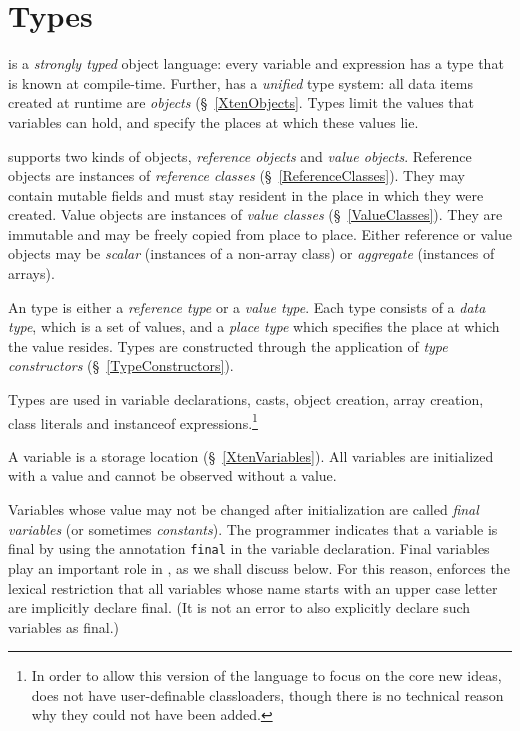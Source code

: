 \chapter{Types}
\label{XtenTypes}

{}\Xten{} is a {\em strongly typed} object language: every variable
and expression has a type that is known at compile-time. Further,
\Xten{} has a {\em unified} type system: all data items created at
runtime are {\em objects} (\S~\ref{XtenObjects}. Types limit the
values that variables can hold, and specify the places at which these
values lie.

{}\Xten{} supports two kinds of objects, {\em reference objects} and
{\em value objects}.  Reference objects are instances of {\em
reference classes} (\S~\ref{ReferenceClasses}). They may contain
mutable fields and must stay resident in the place in which they were
created. Value objects are instances of {\em value classes}
(\S~\ref{ValueClasses}). They are immutable and may be freely copied
from place to place. Either reference or value objects may be 
{\em scalar} (instances of a non-array class) or {\em aggregate} (instances
of arrays).

An \Xten{} type is either a {\em reference type} or a {\em value
type}.  Each type consists of a {\em data type}, which is a set of
values, and a {\em place type} which specifies the place at which the
value resides.  Types are constructed through the application of {\em
type constructors} (\S~\ref{TypeConstructors}).

Types are used in variable declarations, casts, object creation, array
creation, class literals and {\cf instanceof} expressions.\footnote{In
order to allow this version of the language to focus on the core new
ideas, \XtenCurrVer{} does not have user-definable classloaders,
though there is no technical reason why they could not have been
added.}

A variable is a storage location (\S~\ref{XtenVariables}). All
variables are initialized with a value and cannot be observed without
a value. 

Variables whose value may not be changed after initialization are
called {\em final variables} (or sometimes {\em constants}).  The
programmer indicates that a variable is final by using the annotation
{\tt final} in the variable declaration.  Final variables play an
important role in \Xten{}, as we shall discuss below. For this reason,
\Xten{} enforces the lexical restriction that all variables whose name
starts with an upper case letter are implicitly declare final. (It is
not an error to also explicitly declare such variables as final.)

